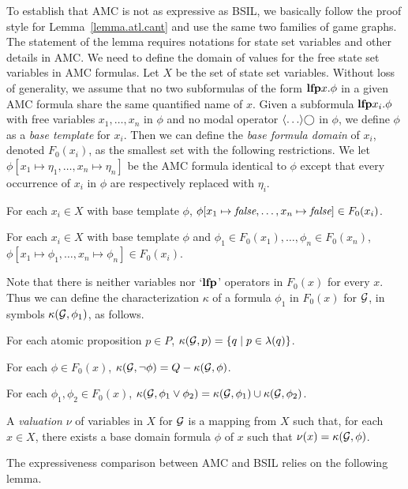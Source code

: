 To establish that AMC is not as expressive as BSIL, we basically follow 
the proof style for Lemma~\ref{lemma.atl.cant} and 
use the same two families of game graphs.  
The statement of the lemma requires notations for 
state set variables and other details in AMC. 
We need to define the domain of values for the free state set variables 
in AMC formulas.  
Let $X$ be the set of state set variables.  
Without loss of generality, we assume that no two subformulas
of the form $\mbox{\bf lfp} x.\phi$ in
a given AMC formula share the same quantified name of $x$.
Given a subformula $\mbox{\bf lfp} x_i.\phi$
with free variables $x_1,\ldots,x_n$ in $\phi$
and no modal operator $\langle\ldots\rangle\bigcirc$ in $\phi$,
we define $\phi$ as a {\em base template} for $x_i$.
Then we can define the {\em base formula domain} of $x_i$,
denoted $F_0(x_i)$,
as the smallest set with the following restrictions.
We let $\phi[x_1\mapsto \eta_1,\ldots,x_n\mapsto\eta_n]$ 
be the AMC formula identical to 
$\phi$ except that every occurrence of $x_i$ in $\phi$ are respectively 
replaced with $\eta_i$.  
\begin{list1}
\item For each $x_i\in X$ with base template $\phi$,
    $\phi[x_1\mapsto\mbox{\em false},\ldots,x_n\mapsto\mbox{\em false}]\in F_0(x_i)$.
\item For each $x_i\in X$ with base template $\phi$
    and $\phi_1\in F_0(x_1),\ldots,\phi_n\in F_0(x_n)$,
    $\phi[x_1\mapsto\phi_1,\ldots,x_n\mapsto\phi_n]\in F_0(x_i)$.
\end{list1}
Note that there is neither variables nor `$\mbox{\bf lfp}$' operators
in $F_0(x)$ for every $x$.
Thus we can define the characterization $\kappa$ 
of a formula $\phi_1$ in $F_0(x)$ for ${\cal G}$,
in symbols $\kappa({\cal G},\phi_1)$, as follows.
\begin{list1}
\item For each atomic proposition $p\in P$,
    $\kappa({\cal G},p)=\{q\mid p\in\lambda(q)\}$.
\item For each $\phi\in F_0(x)$, 
    $\kappa({\cal G},\neg\phi)=Q-\kappa({\cal G},\phi)$.
\item For each $\phi_1,\phi_2\in F_0(x)$,
    $\kappa({\cal G},\phi_1\vee\phi_2)=\kappa({\cal G},\phi_1)\cup\kappa({\cal G},\phi_2)$.
\end{list1}
A {\em valuation} $\nu$ of variables in $X$ for ${\cal G}$
is a mapping from
$X$ such that, for each $x\in X$, there exists a base domain formula
$\phi$ of $x$ such that $\nu(x)= \kappa({\cal G},\phi)$.

The expressiveness comparison between AMC and BSIL relies on the
following lemma.

